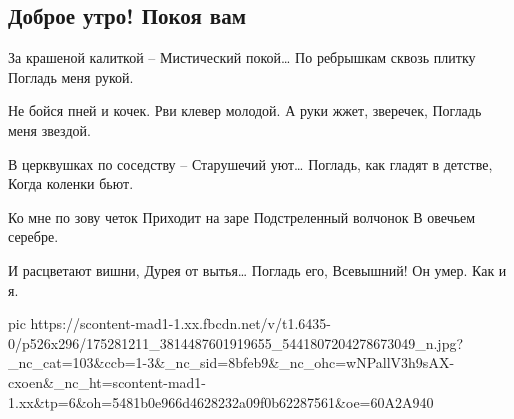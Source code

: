  
 
 
 
 

\subsection{Доброе утро! Покоя вам}
\label{sec:18_04_2021.fb.bilchenko_evgenia.1.pokoj}

За крашеной калиткой –
Мистический покой…
По ребрышкам сквозь плитку
Погладь меня рукой.

Не бойся пней и кочек.
Рви клевер молодой.
А руки жжет, зверечек,
Погладь меня звездой.

В церквушках по соседству –
Старушечий уют…
Погладь, как гладят в детстве,
Когда коленки бьют.

Ко мне по зову четок
Приходит на заре
Подстреленный волчонок
В овечьем серебре.

И расцветают вишни,
Дурея от вытья…
Погладь его, Всевышний!
Он умер. Как и я.


\ifcmt
  pic https://scontent-mad1-1.xx.fbcdn.net/v/t1.6435-0/p526x296/175281211_3814487601919655_5441807204278673049_n.jpg?_nc_cat=103&ccb=1-3&_nc_sid=8bfeb9&_nc_ohc=wNPallV3h9sAX-cxoen&_nc_ht=scontent-mad1-1.xx&tp=6&oh=5481b0e966d4628232a09f0b62287561&oe=60A2A940
\fi

